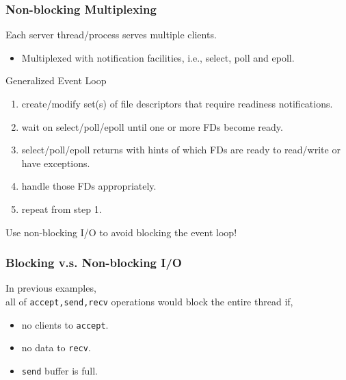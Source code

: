 \documentclass[aspectratio=43]{beamer}
\begin{document}


\begin{frame}[fragile]
  \frametitle{Non-blocking Multiplexing}
  Each server thread/process serves multiple clients.\\
  \begin{itemize}
  \item Multiplexed with notification facilities, i.e., select, poll and epoll.
  \end{itemize}
  \vspace{0.5em}
  Generalized Event Loop
  \begin{enumerate}
  \item create/modify set(s) of file descriptors that require readiness notifications.
  \item wait on select/poll/epoll until one or more FDs become ready.
  \item select/poll/epoll returns with hints of which FDs are ready to read/write or have exceptions.
  \item handle those FDs appropriately.
  \item repeat from step 1.
  \end{enumerate}
  \vspace{1em}
  \begin{center}
  {\large Use non-blocking I/O to avoid blocking the event loop!}
  \end{center}
\end{frame}

\begin{frame}
  \frametitle{Blocking v.s. Non-blocking I/O}

\hspace*{2em} \begin{minipage}{.8\textwidth}
In previous examples,\\[1em]
all of {\tt accept,send,recv} operations would block the entire thread if,
\begin{itemize}
\item no clients to {\tt accept}.
\item no data to {\tt recv}.
\item {\tt send} buffer is full.
\end{itemize}
\vspace{1em}
\end{minipage}
\end{frame}
\end{document}
